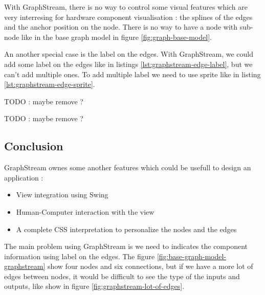 With GraphStream, there is no way to control some visual features which are very interresing for hardware component visualisation :
the splines of the edges and the anchor position on the node.
There is no way to have a node with sub-node like in the base graph model in figure \ref{fig:graph-base-model}.

An another special case is the label on the edges.
With GraphStream, we could add some label on the edges like in listings \ref{lst:graphstream-edge-label}, but we can't add multiple ones.
To add multiple label we need to use sprite like in listing \ref{lst:graphstream-edge-sprite}.

\begin{listing}[p] %
    \centering
    \caption[Add a label on an edge with GraphStream]{TODO : maybe remove ?}
    \label{lst:graphstream-edge-label}
\end{listing} %

\begin{listing}[p] %
    \centering
    \caption[Add two label on an edge with GraphStream]{TODO : maybe remove ?}
    \label{lst:graphstream-edge-sprite}
\end{listing} %


\subsection{Conclusion} %
\label{sub:Conclusion-gs}

GraphStream ownes some another features which could be usefull to design an application :
\begin{itemize}
    \item View integration using Swing
    \item Human-Computer interaction with the view
    \item A complete CSS interpretation to personalize the nodes and the edges
\end{itemize}

The main problem using GraphStream is we need to indicates the component information using label on the edges. The figure \ref{fig:base-graph-model-graphstream} show four nodes and six connections, but
if we have a more lot of edges between nodes, it would be difficult to see the type of the inputs and outputs, like show in figure \ref{fig:graphstream-lot-of-edges}.


